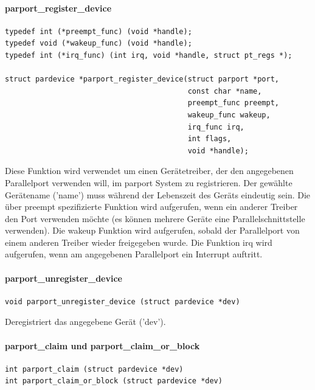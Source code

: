 \documentclass[a4paper,11pt]{article}
\begin{document}
\paragraph{parport\_register\_device}

\begin{verbatim}
typedef int (*preempt_func) (void *handle);
typedef void (*wakeup_func) (void *handle);
typedef int (*irq_func) (int irq, void *handle, struct pt_regs *);

struct pardevice *parport_register_device(struct parport *port,
                                          const char *name,
                                          preempt_func preempt,
                                          wakeup_func wakeup,
                                          irq_func irq,
                                          int flags,
                                          void *handle);
\end{verbatim}

Diese Funktion wird verwendet um einen Gerätetreiber, der den angegebenen Parallelport verwenden will,
im parport System zu registrieren. Der gewählte Gerätename ('name') muss während der Lebenszeit des
Geräts eindeutig sein. 
Die über preempt spezifizierte Funktion wird aufgerufen, wenn ein anderer Treiber den Port verwenden
möchte (es können mehrere Geräte eine Parallelschnittstelle verwenden).
Die wakeup Funktion wird aufgerufen, sobald der Parallelport von einem anderen Treiber wieder
freigegeben wurde. Die Funktion irq wird aufgerufen, wenn am angegebenen Parallelport ein Interrupt
auftritt.

\paragraph{parport\_unregister\_device}

\begin{verbatim}
void parport_unregister_device (struct pardevice *dev)
\end{verbatim}

Deregistriert das angegebene Gerät ('dev').

\paragraph{parport\_claim und parport\_claim\_or\_block}

\begin{verbatim}
int parport_claim (struct pardevice *dev)
int parport_claim_or_block (struct pardevice *dev)
\end{verbatim}
\end{document}
